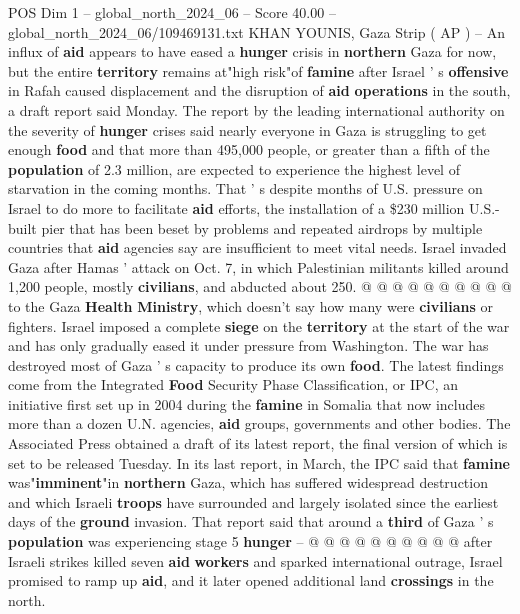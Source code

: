 \begin{textsample}{POS Dim 1 – global\_north\_2024\_06 – Score 40.00 – global\_north\_2024\_06/109469131.txt}  \label{ex:f1_pos_234}
KHAN YOUNIS, Gaza Strip ( AP ) -- An influx of \textbf{aid} appears to have eased a \textbf{hunger} crisis in \textbf{northern} Gaza for now, but the entire \textbf{territory} remains at"high risk"of \textbf{famine} after Israel ' s \textbf{offensive} in Rafah caused displacement and the disruption of \textbf{aid} \textbf{operations} in the south, a draft report said Monday.
The report by the leading international authority on the severity of \textbf{hunger} crises said nearly everyone in Gaza is struggling to get enough \textbf{food} and that more than 495,000 people, or greater than a fifth of the \textbf{population} of 2.3 million, are expected to experience the highest level of starvation in the coming months.
That ' s despite months of U.S. pressure on Israel to do more to facilitate \textbf{aid} efforts, the installation of a \$230 million U.S.-built pier that has been beset by problems and repeated airdrops by multiple countries that \textbf{aid} agencies say are insufficient to meet vital needs.
Israel invaded Gaza after Hamas ' attack on Oct. 7, in which Palestinian militants killed around 1,200 people, mostly \textbf{civilians}, and abducted about 250. @ @ @ @ @ @ @ @ @ @ to the Gaza \textbf{Health} \textbf{Ministry}, which doesn't say how many were \textbf{civilians} or fighters.
Israel imposed a complete \textbf{siege} on the \textbf{territory} at the start of the war and has only gradually eased it under pressure from Washington.
The war has destroyed most of Gaza ' s capacity to produce its own \textbf{food}.
The latest findings come from the Integrated \textbf{Food} Security Phase Classification, or IPC, an initiative first set up in 2004 during the \textbf{famine} in Somalia that now includes more than a dozen U.N. agencies, \textbf{aid} groups, governments and other bodies.
The Associated Press obtained a draft of its latest report, the final version of which is set to be released Tuesday.
In its last report, in March, the IPC said that \textbf{famine} was"\textbf{imminent}"in \textbf{northern} Gaza, which has suffered widespread destruction and which Israeli \textbf{troops} have surrounded and largely isolated since the earliest days of the \textbf{ground} invasion.
That report said that around a \textbf{third} of Gaza ' s \textbf{population} was experiencing stage 5 \textbf{hunger} -- @ @ @ @ @ @ @ @ @ @ after Israeli strikes killed seven \textbf{aid} \textbf{workers} and sparked international outrage, Israel promised to ramp up \textbf{aid}, and it later opened additional land \textbf{crossings} in the north.

\end{textsample}
